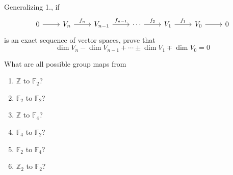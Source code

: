 \begin{exercise}{}{} 
    Generalizing 1., if
    \[ \begin{tikzcd}
        0 \ar[r] & V_n \ar[r,"f_n"] & V_{n-1} \ar[r,"f_{n-1}"] & \cdots \ar[r,"f_2"] & V_1 \ar[r,"f_1"] & V_0 \ar[r] & 0
    \end{tikzcd}\]
    is an exact sequence of vector spaces, prove that 
    \[
    \dim V_n - \dim V_{n-1} + \cdots \pm \dim V_1 \mp \dim V_0 = 0
    \]
\end{exercise}
\begin{exercise}{}{} What are all possible group maps from 
    \begin{enumerate}
        \item $\mathbb{Z}$ to $\mathbb{F}_2$?
        \item $\mathbb{F}_2$ to $\mathbb{F}_2$?
        \item $\mathbb{Z}$ to $\mathbb{F}_4$?
        \item $\mathbb{F}_4$ to $\mathbb{F}_2$?
        \item $\mathbb{F}_2$ to $\mathbb{F}_4$?
        \item $\mathbb{Z}_2$ to $\mathbb{F}_2$?
    \end{enumerate}
\end{exercise}
